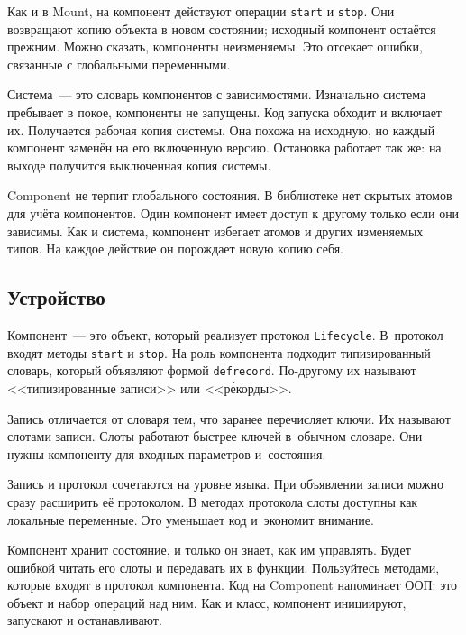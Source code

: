 
Как и в Mount, на компонент действуют операции \verb|start| и \verb|stop|. Они
возвращают копию объекта в новом состоянии; исходный компонент остаётся
прежним. Можно сказать, компоненты неизменяемы. Это отсекает ошибки, связанные с
глобальными переменными.

Система~--- это словарь компонентов с зависимостями. Изначально система
пребывает в покое, компоненты не запущены. Код запуска обходит и включает
их. Получается рабочая копия системы. Она похожа на исходную, но каждый
компонент заменён на его включенную версию. Остановка работает так же: на выходе
получится выключенная копия системы.

Component не терпит глобального состояния. В библиотеке нет скрытых атомов для
учёта компонентов. Один компонент имеет доступ к другому только если они
зависимы. Как и система, компонент избегает атомов и других изменяемых типов. На
каждое действие он порождает новую копию себя.

\subsection{Устройство}

\label{defrecord}

Компонент~--- это объект, который реализует протокол \verb|Lifecycle|. В~протокол
входят методы \verb|start| и \verb|stop|. На роль компонента подходит
типизированный словарь, который объявляют формой \verb|defrecord|. По-другому их
называют <<типизированные записи>> или <<р\'{е}корды>>.


Запись отличается от словаря тем, что заранее перечисляет ключи. Их называют
слотами записи. Слоты работают быстрее ключей в~обычном словаре. Они нужны
компоненту для входных параметров и~состояния.

Запись и протокол сочетаются на уровне языка. При объявлении записи можно сразу
расширить её протоколом. В методах протокола слоты доступны как локальные
переменные. Это уменьшает код и~экономит внимание.


Компонент хранит состояние, и только он знает, как им управлять. Будет ошибкой
читать его слоты и передавать их в функции. Пользуйтесь методами, которые входят
в протокол компонента. Код на Component напоминает ООП: это объект и набор
операций над ним. Как и класс, компонент инициируют, запускают и останавливают.


